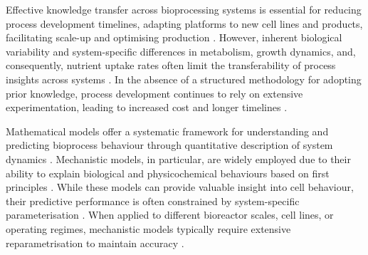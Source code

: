 Effective knowledge transfer across bioprocessing systems is essential for reducing process development timelines, adapting platforms to new cell lines and products, facilitating scale-up and optimising production \cite{Reichelt2017BioprocessCorrelations, Helleckes2023MachinePractice}. However, inherent biological variability and system-specific differences in metabolism, growth dynamics, and, consequently, nutrient uptake rates often limit the transferability of process insights across systems \cite{Chen2019AnCells}. In the absence of a structured methodology for adopting prior knowledge, process development continues to rely on extensive experimentation, leading to increased cost and longer timelines \cite{Kroll2017Model-BasedLifecycle}.

Mathematical models offer a systematic framework for understanding and predicting bioprocess behaviour through quantitative description of system dynamics \cite{Kiparissides2011ClosingVitro}. Mechanistic models, in particular, are widely employed due to their ability to explain biological and physicochemical behaviours based on first principles \cite{Kyriakopoulos2018KineticBiomanufacturing, Almquist2014KineticPerformance}. While these models can provide valuable insight into cell behaviour, their predictive performance is often constrained by system-specific parameterisation \cite{Bayer2023ComparisonPaths}. When applied to different bioreactor scales, cell lines, or operating regimes, mechanistic models typically require extensive reparametrisation to maintain accuracy \cite{Sha2018MechanisticProduction}.
 
